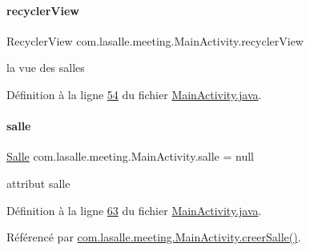 \paragraph{\texorpdfstring{recycler\+View}{recyclerView}}
{\footnotesize\ttfamily Recycler\+View com.\+lasalle.\+meeting.\+Main\+Activity.\+recycler\+View\hspace{0.3cm}{\ttfamily [private]}}



la vue des salles 



Définition à la ligne \hyperlink{_main_activity_8java_source_l00054}{54} du fichier \hyperlink{_main_activity_8java_source}{Main\+Activity.\+java}.

\mbox{\label{classcom_1_1lasalle_1_1meeting_1_1_main_activity_a5d76e925ebb88ff19eca5a30b5ca4588}} 
\paragraph{\texorpdfstring{salle}{salle}}
{\footnotesize\ttfamily \hyperlink{classcom_1_1lasalle_1_1meeting_1_1_salle}{Salle} com.\+lasalle.\+meeting.\+Main\+Activity.\+salle = null\hspace{0.3cm}{\ttfamily [private]}}



attribut salle 



Définition à la ligne \hyperlink{_main_activity_8java_source_l00063}{63} du fichier \hyperlink{_main_activity_8java_source}{Main\+Activity.\+java}.



Référencé par \hyperlink{_main_activity_8java_source_l00398}{com.\+lasalle.\+meeting.\+Main\+Activity.\+creer\+Salle()}.

\mbox{\label{classcom_1_1lasalle_1_1meeting_1_1_main_activity_a44e95026afeb6899f23283db298f94c9}} 

